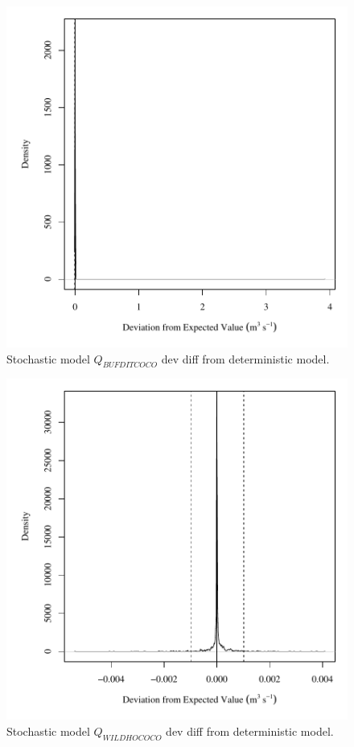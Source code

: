 \begin{center}
\begin{figure}[htbp]
	\includegraphics[width=6in]{"Figures/Results_DSR/V dev diff qBUF"}
	\caption{Stochastic model $Q_{BUFDITCOCO}$ dev diff from deterministic model.}
\end{figure}
\end{center}
\newpage

\begin{center}
\begin{figure}[htbp]
	\includegraphics[width=6in]{"Figures/Results_DSR/V dev diff qWIL"}
	\caption{Stochastic model $Q_{WILDHOCOCO}$ dev diff from deterministic model.}
\end{figure}
\end{center}
\newpage

